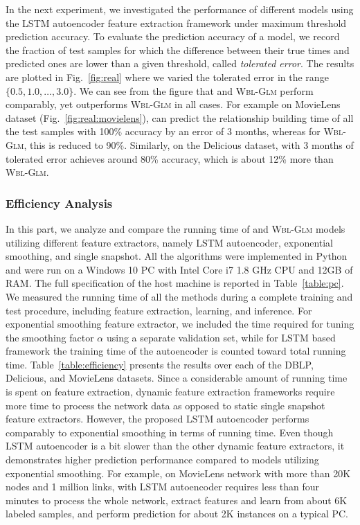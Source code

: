 In the next experiment, we investigated the performance of different models using the LSTM autoencoder feature extraction framework under maximum threshold prediction accuracy. To evaluate the prediction accuracy of a model, we record the fraction of test samples for which the difference between their true times and predicted ones are lower than a given threshold, called \emph{tolerated error}. The results are plotted in Fig.~\ref{fig:real} where we varied the tolerated error in the range $\{0.5, 1.0, \dots, 3.0\}$. We can see from the figure that \npglm and \textsc{Wbl-Glm} perform comparably, yet \npglm outperforms \textsc{Wbl-Glm} in all cases. For example on MovieLens dataset (Fig.~\ref{fig:real:movielens}), \npglm can predict the relationship building time of all the test samples with 100\% accuracy by an error of 3 months, whereas for \textsc{Wbl-Glm}, this is reduced to 90\%. Similarly, on the Delicious dataset, \npglm with 3 months of tolerated error achieves around 80\% accuracy, which is about 12\% more than \textsc{Wbl-Glm}.


\subsubsection{Efficiency Analysis}
In this part, we analyze and compare the running time of \npglm and \textsc{Wbl-Glm} models utilizing different feature extractors, namely LSTM autoencoder, exponential smoothing, and single snapshot. All the algorithms were implemented in Python and were run on a Windows 10 PC with Intel Core i7 1.8 GHz CPU and 12GB of RAM. The full specification of the host machine is reported in Table~\ref{table:pc}. We measured the running time of all the methods during a complete training and test procedure, including feature extraction, learning, and inference. For exponential smoothing feature extractor, we included the time required for tuning the smoothing factor $\alpha$ using a separate validation set, while for LSTM based framework the training time of the autoencoder is counted toward total running time. Table~\ref{table:efficiency} presents the results over each of the DBLP, Delicious, and MovieLens datasets. Since a considerable amount of running time is spent on feature extraction, dynamic feature extraction frameworks require more time to process the network data as opposed to static single snapshot feature extractors. However, the proposed LSTM autoencoder performs comparably to exponential smoothing in terms of running time. Even though LSTM autoencoder is a bit slower than the other dynamic feature extractors, it demonstrates higher prediction performance compared to models utilizing exponential smoothing. For example, on MovieLens network with more than 20K nodes and 1 million links, \npglm with LSTM autoencoder requires less than four minutes to process the whole network, extract features and learn from about 6K labeled samples, and perform prediction for about 2K instances on a typical PC.


